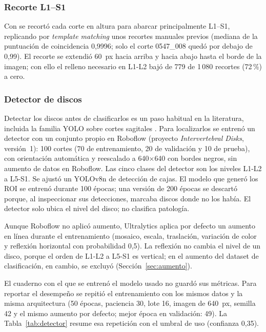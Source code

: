 \subsubsection{Recorte L1--S1}
Con  se recortó cada corte en altura para abarcar principalmente L1--S1, replicando por \emph{template matching} unos recortes manuales previos (mediana de la puntuación de coincidencia 0,9996; solo el corte 0547\_008 quedó por debajo de 0,99). El recorte se extendió 60~px hacia arriba y hacia abajo hasta el borde de la imagen; con ello el relleno necesario en L1-L2 bajó de 779 de 1\,080 recortes (72\,\%) a cero.

\subsubsection{Detector de discos}
Detectar los discos antes de clasificarlos es un paso habitual en la literatura, incluida la familia YOLO sobre cortes sagitales \cite{tan2024,sayed2025scirep}. Para localizarlos se entrenó un detector con un conjunto propio en Roboflow (proyecto \emph{Intervertebral Disks}, versión~1): 100 cortes (70 de entrenamiento, 20 de validación y 10 de prueba), con orientación automática y reescalado a 640$\times$640 con bordes negros, sin aumento de datos en Roboflow. Las cinco clases del detector son los niveles L1-L2 a L5-S1. Se ajustó un YOLOv8n de detección de cajas. El modelo que generó los ROI se entrenó durante 100 épocas; una versión de 200 épocas se descartó porque, al inspeccionar sus detecciones, marcaba discos donde no los había. El detector solo ubica el nivel del disco; no clasifica patología.

Aunque Roboflow no aplicó aumento, Ultralytics aplica por defecto un aumento en línea durante el entrenamiento (mosaico, escala, traslación, variación de color y reflexión horizontal con probabilidad 0,5). La reflexión no cambia el nivel de un disco, porque el orden de L1-L2 a L5-S1 es vertical; en el aumento del dataset de clasificación, en cambio, se excluyó (Sección~\ref{sec:aumento}).

El cuaderno con el que se entrenó el modelo usado no guardó sus métricas. Para reportar el desempeño se repitió el entrenamiento con los mismos datos y la misma arquitectura (50 épocas, paciencia 30, lote 16, imagen de 640~px, semilla 42 y el mismo aumento por defecto; mejor época en validación: 49). La Tabla~\ref{tab:detector} resume esa repetición con el umbral de uso (confianza 0,35).

